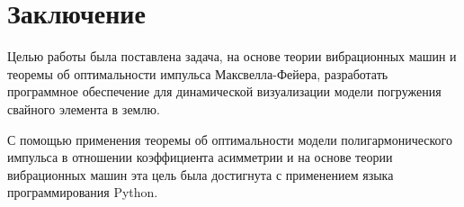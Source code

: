 \clearpage
\section{Заключение}

Целью работы была поставлена задача, на основе теории вибрационных машин и теоремы об оптимальности импульса Максвелла-Фейера,
разработать программное обеспечение для динамической визуализации модели погружения свайного элемента в землю.

С помощью применения теоремы об оптимальности модели полигармонического импульса в отношении коэффициента асимметрии и на основе теории вибрационных машин
эта цель была достигнута с применением языка программирования Python.


\clearpage
{}
\nocite{*}
\printbibliography{}
